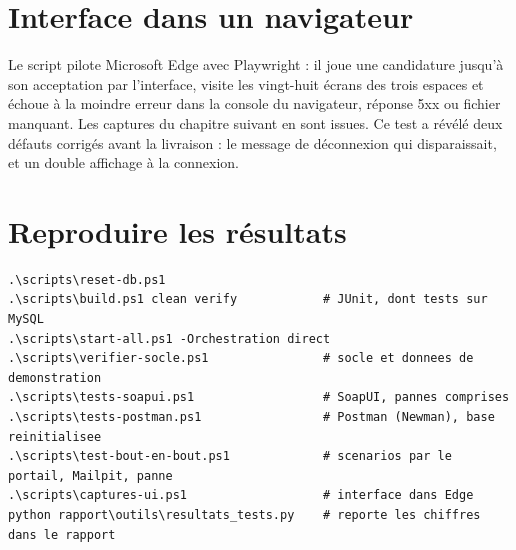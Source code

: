 
\section{Interface dans un navigateur}

Le script  pilote Microsoft Edge avec Playwright : il joue une candidature jusqu'à son acceptation par l'interface, visite les vingt-huit écrans des trois espaces et échoue à la moindre erreur dans la console du navigateur, réponse 5xx ou fichier manquant. Les captures du chapitre suivant en sont issues. Ce test a révélé deux défauts corrigés avant la livraison : le message de déconnexion qui disparaissait, et un double affichage à la connexion.

\section{Reproduire les résultats}

\begin{lstlisting}[language={}, caption={Rejouer l'ensemble des tests (PowerShell, à la racine du projet)}]
.\scripts\reset-db.ps1
.\scripts\build.ps1 clean verify            # JUnit, dont tests sur MySQL
.\scripts\start-all.ps1 -Orchestration direct
.\scripts\verifier-socle.ps1                # socle et donnees de demonstration
.\scripts\tests-soapui.ps1                  # SoapUI, pannes comprises
.\scripts\tests-postman.ps1                 # Postman (Newman), base reinitialisee
.\scripts\test-bout-en-bout.ps1             # scenarios par le portail, Mailpit, panne
.\scripts\captures-ui.ps1                   # interface dans Edge
python rapport\outils\resultats_tests.py    # reporte les chiffres dans le rapport
\end{lstlisting}
